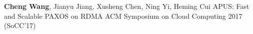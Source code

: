\cvpub
{\textbf{Cheng Wang}, Jianyu Jiang, Xusheng Chen, Ning Yi, Heming Cui} %
{APUS: Fast and Scalable PAXOS on RDMA} %
{} %
{} %
{ %
ACM Symposium on Cloud Computing 2017 (SoCC'17)\newline
}
